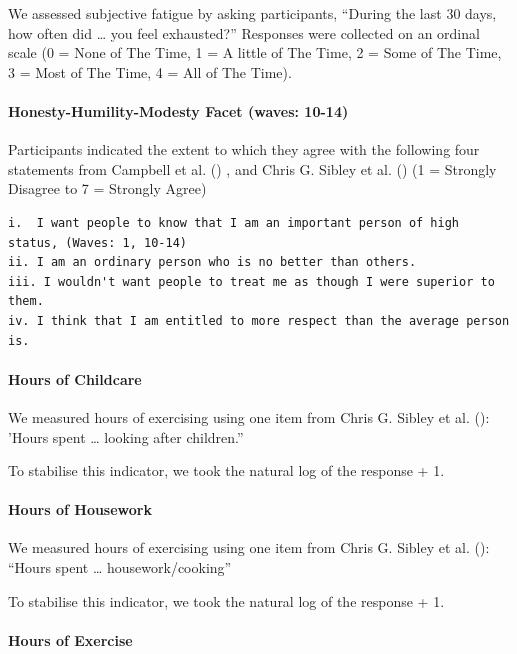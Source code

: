 \documentclass[
  single column]{article}
\let\oldparagraph\paragraph
\renewcommand{\paragraph}[1]{\oldparagraph{#1}\mbox{}}
\begin{document}
We assessed subjective fatigue by asking participants, ``During the last
30 days, how often did \ldots{} you feel exhausted?'' Responses were
collected on an ordinal scale (0 = None of The Time, 1 = A little of The
Time, 2 = Some of The Time, 3 = Most of The Time, 4 = All of The Time).

\paragraph{Honesty-Humility-Modesty Facet (waves:
10-14)}\label{honesty-humility-modesty-facet-waves-10-14}

Participants indicated the extent to which they agree with the following
four statements from Campbell et al. ()
, and Chris G. Sibley et al. () (1 =
Strongly Disagree to 7 = Strongly Agree)

\begin{verbatim}
i.  I want people to know that I am an important person of high status, (Waves: 1, 10-14)
ii. I am an ordinary person who is no better than others.
iii. I wouldn't want people to treat me as though I were superior to them.
iv. I think that I am entitled to more respect than the average person is.
\end{verbatim}

\paragraph{Hours of Childcare}\label{hours-of-childcare}

We measured hours of exercising using one item from Chris G. Sibley et
al. (): 'Hours spent \ldots{} looking
after children.''

To stabilise this indicator, we took the natural log of the response +
1.

\paragraph{Hours of Housework}\label{hours-of-housework}

We measured hours of exercising using one item from Chris G. Sibley et
al. (): ``Hours spent \ldots{}
housework/cooking''

To stabilise this indicator, we took the natural log of the response +
1.

\paragraph{Hours of Exercise}\label{hours-of-exercise}
\end{document}
